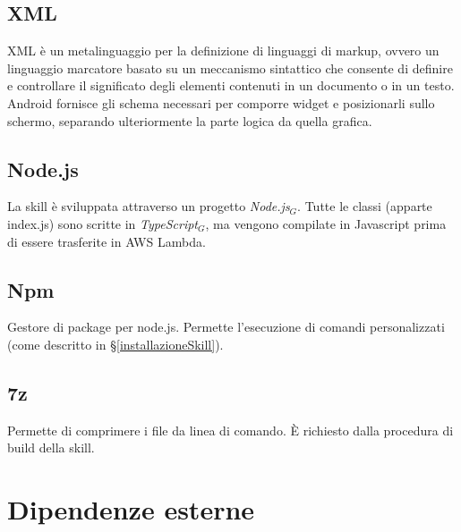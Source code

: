 \subsection{XML}
XML è un metalinguaggio per la definizione di linguaggi di markup, ovvero un linguaggio marcatore basato su un meccanismo sintattico che consente di definire e controllare il significato degli elementi contenuti in un documento o in un testo.\\ 
Android fornisce gli schema necessari per comporre widget e posizionarli sullo schermo, separando ulteriormente la parte logica da quella grafica. 

\subsection{Node.js}
La skill è sviluppata attraverso un progetto \textit{Node.js$_{G}$}. Tutte le classi (apparte index.js) sono scritte in \textit{TypeScript$_{G}$}, ma vengono compilate in Javascript prima di essere trasferite in AWS Lambda.
\subsection{Npm}
Gestore di package per node.js. Permette l'esecuzione di comandi personalizzati (come descritto in \S\ref{installazioneSkill}).
\subsection{7z}
Permette di comprimere i file da linea di comando. \`{E} richiesto dalla procedura di build della skill.



\section{Dipendenze esterne}


